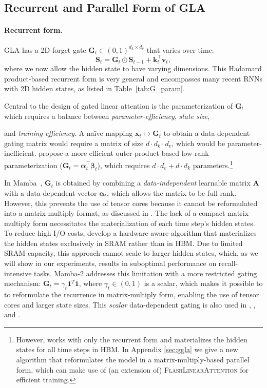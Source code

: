 \subsection{Recurrent and Parallel Form of GLA}

\label{ssec:gla}

\paragraph{Recurrent form.} GLA has a 2D forget gate \({\mathbf{G}}_t \in (0,1)^{d_k \times d_v}\) that varies over time:
\[
{\mathbf{S}}_t = {\mathbf{G}}_t \odot {\mathbf{S}}_{t-1} + {\bm{k}}_t^{\top} {\bm{v}}_t,
\]
where we now allow the hidden state to have varying dimensions. This Hadamard product-based  recurrent form is very general and encompasses many recent RNNs with 2D hidden states, as listed in Table~\ref{tab:G_param}. 

Central to the design of gated linear attention  is the parameterization of \({\mathbf{G}}_t\) which requires a balance between \textit{parameter-efficiency}, \textit{state size}, 

and \textit{training efficiency}. A na\"{i}ve mapping ${\bm{x}}_t \mapsto {\mathbf{G}}_{t}$ to obtain a data-dependent gating matrix would require a matrix of size $d \cdot d_k \cdot d_v$, which would be parameter-inefficient. \citet{mao-2022-fine} propose a more efficient outer-product-based low-rank parameterization (\({\mathbf{G}}_t = {\bm{\alpha}}_t^{\top} {\bm{\beta}}_t\)), which requires $d \cdot d_v + d  \cdot d_k$ parameters.\footnote{However, \citet{mao-2022-fine} works with only the recurrent form and materializes the hidden states for all time steps in HBM. In Appendix \ref{sec:ggla} we give a new algorithm that reformulates the model in a matrix-multiply-based parallel form, which can make use of (an extension of) \textsc{FlashLinearAttention} for efficient training.}

In Mamba~\cite{Gu2023MambaLS}, \({\mathbf{G}}_t\) is obtained by combining a  \emph{data-independent} learnable matrix \({\bm{A}}\) with a data-dependent vector ${\bm{\alpha}}_t$, which allows the matrix to be full rank. However, this prevents the use of tensor cores because it cannot be reformulated into a matrix-multiply format, as discussed in  \citet{mamba2}. The lack of a compact matrix-multiply form  necessitates the materialization of each time step's hidden states. To reduce high I/O costs, \citet{Gu2023MambaLS} develop a hardware-aware algorithm that materializes the hidden states {exclusively} in  SRAM rather than in HBM. Due to limited SRAM capacity, this approach cannot scale to larger hidden states, which, as we will show in our experiments, results in suboptimal performance on recall-intensive tasks. Mamba-2 \cite{mamba2} addresses this limitation with a more {restricted} gating mechanism: \({\mathbf{G}}_t = \gamma_t \mathbf{1}^T \mathbf{1}\), where \(\gamma_t \in (0,1)\) is a scalar, which makes it possible to to reformulate the recurrence in matrix-multiply form, enabling the use of tensor cores and larger  state sizes. This \emph{scalar} data-dependent gating is also used in \citet{peng2021random}, \citet{Sun2024YouOC}, and \citet{beck2024xlstm}. 

